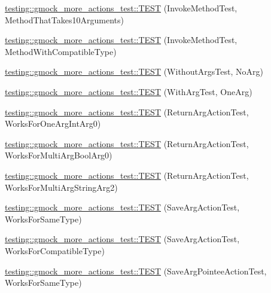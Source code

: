 \begin{DoxyCompactItemize}
\item 
\hyperlink{namespacetesting_1_1gmock__more__actions__test_a14b55eb4c0d0b3149e269eea1443cb58}{testing\+::gmock\+\_\+more\+\_\+actions\+\_\+test\+::\+T\+E\+ST} (Invoke\+Method\+Test, Method\+That\+Takes10\+Arguments)
\item 
\hyperlink{namespacetesting_1_1gmock__more__actions__test_adb0c29d688c079ad5bf07d5a0bd72aea}{testing\+::gmock\+\_\+more\+\_\+actions\+\_\+test\+::\+T\+E\+ST} (Invoke\+Method\+Test, Method\+With\+Compatible\+Type)
\item 
\hyperlink{namespacetesting_1_1gmock__more__actions__test_a68748f21021e787dfdc095691c94d495}{testing\+::gmock\+\_\+more\+\_\+actions\+\_\+test\+::\+T\+E\+ST} (Without\+Args\+Test, No\+Arg)
\item 
\hyperlink{namespacetesting_1_1gmock__more__actions__test_a40664c1acdc3650e8edf9a9a49b008de}{testing\+::gmock\+\_\+more\+\_\+actions\+\_\+test\+::\+T\+E\+ST} (With\+Arg\+Test, One\+Arg)
\item 
\hyperlink{namespacetesting_1_1gmock__more__actions__test_a717ea38d7b78b6d51b4d617ed317d26e}{testing\+::gmock\+\_\+more\+\_\+actions\+\_\+test\+::\+T\+E\+ST} (Return\+Arg\+Action\+Test, Works\+For\+One\+Arg\+Int\+Arg0)
\item 
\hyperlink{namespacetesting_1_1gmock__more__actions__test_a0705d7e6083d129caae9d91cc5d6d570}{testing\+::gmock\+\_\+more\+\_\+actions\+\_\+test\+::\+T\+E\+ST} (Return\+Arg\+Action\+Test, Works\+For\+Multi\+Arg\+Bool\+Arg0)
\item 
\hyperlink{namespacetesting_1_1gmock__more__actions__test_ae280b3b95b0cdfcf7b81de95c8fe942d}{testing\+::gmock\+\_\+more\+\_\+actions\+\_\+test\+::\+T\+E\+ST} (Return\+Arg\+Action\+Test, Works\+For\+Multi\+Arg\+String\+Arg2)
\item 
\hyperlink{namespacetesting_1_1gmock__more__actions__test_a511b9c6721629465fd1e2fbd65633ef9}{testing\+::gmock\+\_\+more\+\_\+actions\+\_\+test\+::\+T\+E\+ST} (Save\+Arg\+Action\+Test, Works\+For\+Same\+Type)
\item 
\hyperlink{namespacetesting_1_1gmock__more__actions__test_a2b92b573de73fdf97dad4da8a67d7fc0}{testing\+::gmock\+\_\+more\+\_\+actions\+\_\+test\+::\+T\+E\+ST} (Save\+Arg\+Action\+Test, Works\+For\+Compatible\+Type)
\item 
\hyperlink{namespacetesting_1_1gmock__more__actions__test_a51d471708cb6fa3c403ea1d936a49dc1}{testing\+::gmock\+\_\+more\+\_\+actions\+\_\+test\+::\+T\+E\+ST} (Save\+Arg\+Pointee\+Action\+Test, Works\+For\+Same\+Type)
\item 

\end{DoxyCompactItemize}
